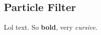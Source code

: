 \documentclass[Main]{subfiles}
\begin{document}
\subsection{Particle Filter} %
	\label{sec:particlefilter}

	Lol text.
	So \textbf{bold}, very \emph{cursive}.

\end{document}
